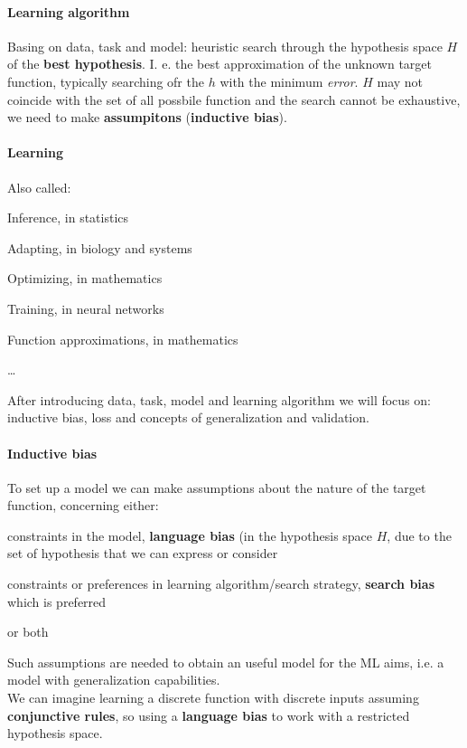 \documentclass[10pt]{report}
\begin{document}
\paragraph{Learning algorithm} Basing on data, task and model: heuristic search through the hypothesis space $H$ of the \textbf{best hypothesis}. I. e. the best approximation of the unknown target function, typically searching ofr the $h$ with the minimum \textit{error}. $H$ may not coincide with the set of all possbile function and the search cannot be exhaustive, we need to make \textbf{assumpitons} (\textbf{inductive bias}).
\paragraph{Learning} Also called:
\begin{list}{}{}
	\item Inference, in statistics
	\item Adapting, in biology and systems
	\item Optimizing, in mathematics
	\item Training, in neural networks
	\item Function approximations, in mathematics
	\item \ldots
\end{list}
After introducing data, task, model and learning algorithm we will focus on: inductive bias, loss and concepts of generalization and validation.
\paragraph{Inductive bias} To set up a model we can make assumptions about the nature of the target function, concerning either:
\begin{list}{}{}
	\item constraints in the model, \textbf{language bias} (in the hypothesis space $H$, due to the set of hypothesis that we can express or consider
	\item constraints or preferences in learning algorithm/search strategy, \textbf{search bias} which is preferred
	\item or both
\end{list}
Such assumptions are needed to obtain an useful model for the ML aims, i.e. a model with generalization capabilities.\\
We can imagine learning a discrete function with discrete inputs assuming \textbf{conjunctive rules}, so using a \textbf{language bias} to work with a restricted hypothesis space.
\end{document}
